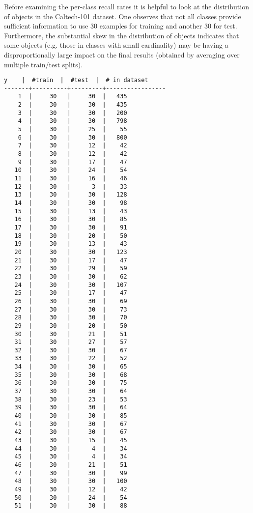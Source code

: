 \documentclass[10pt]{article}
\begin{document}
Before examining the per-class recall rates it is helpful to look at the distribution of objects in the Caltech-101 dataset.
One observes that not all classes provide sufficient information to use 30 examples for training and another 30 for test.  
Furthermore, the substantial skew in the distribution of objects indicates that some objects (e.g. those in classes with small cardinality) may be having a disproportionally large impact on the final results (obtained by averaging over multiple train/test splits).

\begin{Verbatim}[fontsize=\small, commandchars=\\\{\}]
  y    |  #train  |  #test  |  # in dataset 
-------+----------+---------+-----------------
    1  |     30   |     30  |   435
    2  |     30   |     30  |   435
    3  |     30   |     30  |   200
    4  |     30   |     30  |   798
    5  |     30   |     25  |    55
    6  |     30   |     30  |   800
    7  |     30   |     12  |    42
    8  |     30   |     12  |    42
    9  |     30   |     17  |    47
   10  |     30   |     24  |    54
   11  |     30   |     16  |    46
   12  |     30   |      3  |    33
   13  |     30   |     30  |   128
   14  |     30   |     30  |    98
   15  |     30   |     13  |    43
   16  |     30   |     30  |    85
   17  |     30   |     30  |    91
   18  |     30   |     20  |    50
   19  |     30   |     13  |    43
   20  |     30   |     30  |   123
   21  |     30   |     17  |    47
   22  |     30   |     29  |    59
   23  |     30   |     30  |    62
   24  |     30   |     30  |   107
   25  |     30   |     17  |    47
   26  |     30   |     30  |    69
   27  |     30   |     30  |    73
   28  |     30   |     30  |    70
   29  |     30   |     20  |    50
   30  |     30   |     21  |    51
   31  |     30   |     27  |    57
   32  |     30   |     30  |    67
   33  |     30   |     22  |    52
   34  |     30   |     30  |    65
   35  |     30   |     30  |    68
   36  |     30   |     30  |    75
   37  |     30   |     30  |    64
   38  |     30   |     23  |    53
   39  |     30   |     30  |    64
   40  |     30   |     30  |    85
   41  |     30   |     30  |    67
   42  |     30   |     30  |    67
   43  |     30   |     15  |    45
   44  |     30   |      4  |    34
   45  |     30   |      4  |    34
   46  |     30   |     21  |    51
   47  |     30   |     30  |    99
   48  |     30   |     30  |   100
   49  |     30   |     12  |    42
   50  |     30   |     24  |    54
   51  |     30   |     30  |    88

\end{Verbatim}
\end{document}
